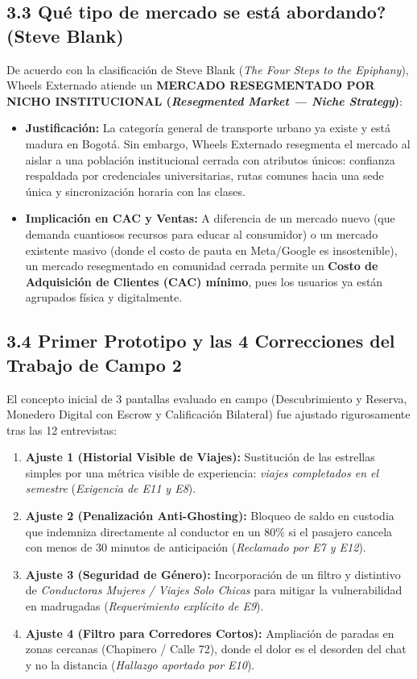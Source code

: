 \documentclass[11pt,a4paper]{article}
\begin{document}
\subsection{3.3 \textquestiondown Qu\'e tipo de mercado se est\'a abordando? (Steve Blank)}
De acuerdo con la clasificaci\'on de Steve Blank (\textit{The Four Steps to the Epiphany}), Wheels Externado atiende un \textbf{MERCADO RESEGMENTADO POR NICHO INSTITUCIONAL (\textit{Resegmented Market --- Niche Strategy})}:
\begin{itemize}[leftmargin=*]
    \item \textbf{Justificaci\'on:} La categor\'ia general de transporte urbano ya existe y est\'a madura en Bogot\'a. Sin embargo, Wheels Externado resegmenta el mercado al aislar a una poblaci\'on institucional cerrada con atributos \'unicos: confianza respaldada por credenciales universitarias, rutas comunes hacia una sede \'unica y sincronizaci\'on horaria con las clases.
    \item \textbf{Implicaci\'on en CAC y Ventas:} A diferencia de un mercado nuevo (que demanda cuantiosos recursos para educar al consumidor) o un mercado existente masivo (donde el costo de pauta en Meta/Google es insostenible), un mercado resegmentado en comunidad cerrada permite un \textbf{Costo de Adquisici\'on de Clientes (CAC) m\'inimo}, pues los usuarios ya est\'an agrupados f\'isica y digitalmente.
\end{itemize}

\subsection{3.4 Primer Prototipo y las 4 Correcciones del Trabajo de Campo 2}
El concepto inicial de 3 pantallas evaluado en campo (Descubrimiento y Reserva, Monedero Digital con Escrow y Calificaci\'on Bilateral) fue ajustado rigurosamente tras las 12 entrevistas:
\begin{enumerate}[leftmargin=*]
    \item \textbf{Ajuste 1 (Historial Visible de Viajes):} Sustituci\'on de las estrellas simples por una m\'etrica visible de experiencia: \textit{ viajes completados en el semestre\guillemotright} (\textit{Exigencia de E11 y E8}).
    \item \textbf{Ajuste 2 (Penalizaci\'on Anti-Ghosting):} Bloqueo de saldo en custodia que indemniza directamente al conductor en un 80\% si el pasajero cancela con menos de 30 minutos de anticipaci\'on (\textit{Reclamado por E7 y E12}).
    \item \textbf{Ajuste 3 (Seguridad de G\'enero):} Incorporaci\'on de un filtro y distintivo de \textit{\guillemotleft Conductoras Mujeres / Viajes Solo Chicas\guillemotright} para mitigar la vulnerabilidad en madrugadas (\textit{Requerimiento expl\'icito de E9}).
    \item \textbf{Ajuste 4 (Filtro para Corredores Cortos):} Ampliaci\'on de paradas en zonas cercanas (Chapinero / Calle 72), donde el dolor es el desorden del chat y no la distancia (\textit{Hallazgo aportado por E10}).
\end{enumerate}
\end{document}
